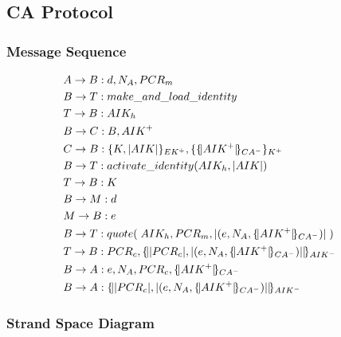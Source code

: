 \documentclass[10pt]{article}
\begin{document}
\newpage

\subsection*{CA Protocol}

\subsubsection*{Message Sequence}

\def \pmask {PCR_{m}}
\def \pcomp {PCR_{c}}
\def \evd {d}
\def \eve {e}
\def \cacert {\sign {\public{AIK}}{CA}}
\def \exdata {\hashe{(\eve, \nonce{A}, \cacert ) }}
\def \aikh {AIK_{h}}

\def \app {A}
\def \att {B}
\def \ca {C}
\def \mea {M}
\def \tp {T}

\def \req {R}
\def \resp {P}
\def \k {K}

\begin{align*}
  & \sndmsg {\app}{\att} {\evd, \nonce{\app}, \pmask}  & \\
    & \sndmsg{\att}{\tp} {make\_and\_load\_identity} & \\
      & \sndmsg{\tp}{\att} {\aikh} & \\
        & \sndmsg{\att}{\ca} {\att, \public{AIK}}  & \\
  & \sndmsg{\ca}{\att} {\encrypt{K, \hashe{AIK}}{EK}, \encrypt{\cacert}{K}} & \\
    & \sndmsg{\att}{\tp} {activate\_identity({\aikh, \hashe{AIK})}} & \\
  & \sndmsg{\tp}{\att} {K} & \\
    & \sndmsg{\att}{\mea} {\evd}  & \\
  & \sndmsg{\mea}{\att} {\eve}  & \\
  & \sndmsg{\att}{\tp} {quote(\;{AIK_{h}, \pmask, \exdata}\;)} & \\
  & \sndmsg{\tp}{\att} {\pcomp, \sign{\hashe{\pcomp}, \exdata}{AIK}}  & \\
  & \sndmsg{\att}{\app} {\eve, \nonce{\app}, \pcomp, \cacert}  & \\
  & \sndmsg{\att}{\app} {\sign{\hashe{\pcomp}, \exdata}{AIK}}  & 
\end{align*}

\subsubsection*{Strand Space Diagram}
\end{document}
